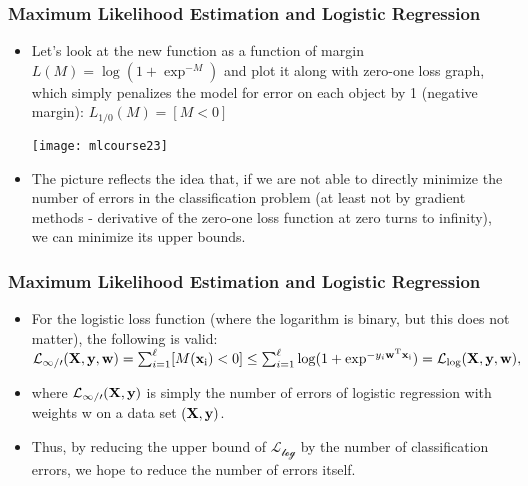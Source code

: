 \begin{frame}[fragile]\frametitle{Maximum Likelihood Estimation and Logistic Regression}
 \begin{itemize}

 \item Let's look at the new function as a function of margin $L(M) = \log (1 + \exp^{-M})$ and plot it along with zero-one loss graph, which simply penalizes the model for error on each object by 1 (negative margin): $L_{1/0}(M) = [M < 0]$
 
 \begin{center}
\texttt{[image: mlcourse23]}
\end{center}

\item The picture reflects the idea that, if we are not able to directly minimize the number of errors in the classification problem (at least not by gradient methods - derivative of the zero-one loss function at zero turns to infinity), we can minimize its upper bounds.
\end{itemize}

\end{frame}

\begin{frame}[fragile]\frametitle{Maximum Likelihood Estimation and Logistic Regression}
 \begin{itemize}

 \item For the logistic loss function (where the logarithm is binary, but this does not matter), the following is valid: $\mathcal{L_{1/0}} (\textbf X, \textbf{y}, \textbf{w}) = \sum_{i=1}^{\ell} [M(\textbf{x}_\text{i}) < 0] \leq \sum_{i=1}^{\ell} \log (1 + \exp^{-y_i\textbf{w}^\text{T}\textbf{x}_\text{i}}) = \mathcal{L_{\log}} (\textbf X, \textbf{y}, \textbf{w}),$
 
 \item where $\mathcal{L_{1/0}} (\textbf X, \textbf{y})$ is simply the number of errors of logistic regression with weights w on a data set $(\textbf X, \textbf{y})$.
 
 \item Thus, by reducing the upper bound of $\mathcal{L_{log}}$ by the number of classification errors, we hope to reduce the number of errors itself.
\end{itemize}

\end{frame}



